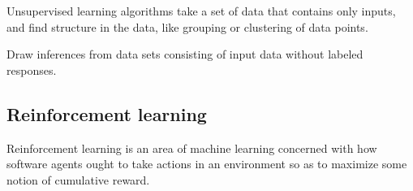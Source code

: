 \documentclass{article}
\begin{document}
Unsupervised learning algorithms take a set of data that 
contains only inputs, and find structure in the data, like 
grouping or clustering of data points.

\bigskip

\noindent Draw inferences from data sets consisting of input 
data without labeled responses.

\subsection{Reinforcement learning}
       
Reinforcement learning is an area of machine learning concerned 
with how software agents ought to take actions in an environment 
so as to maximize some notion of cumulative reward.

\printindex
\end{document}
